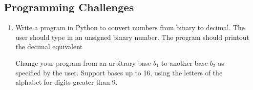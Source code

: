 \subsection{Programming Challenges}
\begin{enumerate}
	\item Write a program in Python to convert numbers from binary to decimal. The user should type in an unsigned binary number. The program should printout the decimal equivalent

	\bonus Change your program from an arbitrary base $b_1$ to another base $b_2$ as specified by the user. Support bases up to 16, using the letters of the alphabet for digits greater than 9.
\end{enumerate}
